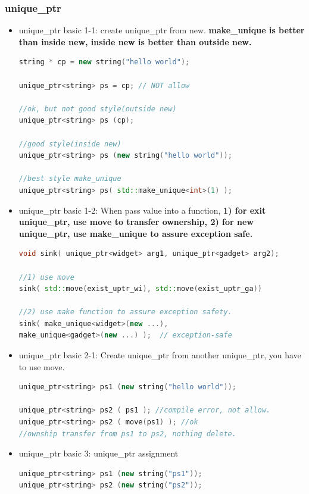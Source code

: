 \documentclass[a4paper,12pt,twoside]{book}
\begin{document}
\subsubsection{unique\_ptr}
\begin{itemize}

\item unique\_ptr basic 1-1: create unique\_ptr from new.    \textbf{make\_unique is better than inside new, inside new is better than outside new.}
\begin{lstlisting}[frame=single, language=c++]
string * cp = new string("hello world");

unique_ptr<string> ps = cp; // NOT allow

//ok, but not good style(outside new)
unique_ptr<string> ps (cp);

//good style(inside new)
unique_ptr<string> ps (new string("hello world"));

//best style make_unique
unique_ptr<string> ps( std::make_unique<int>(1) );
\end{lstlisting}

\item unique\_ptr basic 1-2: When pass value into a function, \textbf{1) for exit unique\_ptr, use move to transfer ownership, 2) for new unique\_ptr, use make\_unique to assure exception safe.}
\begin{lstlisting}[frame=single, language=c++]
void sink( unique_ptr<widget> arg1, unique_ptr<gadget> arg2);

//1) use move
sink( std::move(exist_uptr_wi), std::move(exist_uptr_ga))

//2) use make function to assure exception safety.
sink( make_unique<widget>(new ...),
make_unique<gadget>(new ...) );  // exception-safe
\end{lstlisting}

\item unique\_ptr basic 2-1: Create unique\_ptr from another unique\_ptr, you have to use move.
\begin{lstlisting}[frame=single, language=c++]
unique_ptr<string> ps1 (new string("hello world"));

unique_ptr<string> ps2 ( ps1 ); //compile error, not allow.
unique_ptr<string> ps2 ( move(ps1) ); //ok
//ownship transfer from ps1 to ps2, nothing delete.
\end{lstlisting}


\item unique\_ptr basic 3: unique\_ptr assignment
\begin{lstlisting}[frame=single, language=c++]
unique_ptr<string> ps1 (new string("ps1"));
unique_ptr<string> ps2 (new string("ps2"));


\end{lstlisting}
\end{itemize}
\end{document}
